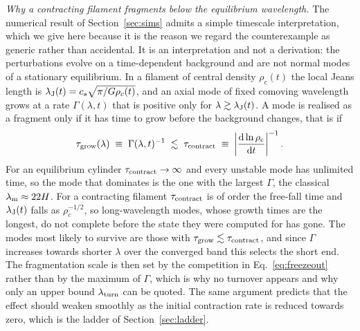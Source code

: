 \documentclass[usenatbib,twoside,twocolumn]{mnras}
\begin{document}
\emph{Why a contracting filament fragments below the equilibrium wavelength.} The numerical result of Section~\ref{sec:sims} admits a simple timescale interpretation, which we give here because it is the reason we regard the counterexample as generic rather than accidental. It is an interpretation and not a derivation: the perturbations evolve on a time-dependent background and are not normal modes of a stationary equilibrium. In a filament of central density $\rho_c(t)$ the local Jeans length is $\lambda_{\rm J}(t)=c_s\sqrt{\pi/G\rho_c(t)}$, and an axial mode of fixed comoving wavelength grows at a rate $\Gamma(\lambda,t)$ that is positive only for $\lambda\gtrsim\lambda_{\rm J}(t)$. A mode is realised as a fragment only if it has time to grow before the background changes, that is if
\begin{equation}
\tau_{\rm grow}(\lambda)\;\equiv\;\Gamma(\lambda,t)^{-1}\;\lesssim\;\tau_{\rm contract}\;\equiv\;\left|\frac{\rm d\ln\rho_c}{{\rm d}t}\right|^{-1}.
\label{eq:freezeout}
\end{equation}
For an equilibrium cylinder $\tau_{\rm contract}\to\infty$ and every unstable mode has unlimited time, so the mode that dominates is the one with the largest $\Gamma$, the classical $\lambda_{\rm m}\approx22H$. For a contracting filament $\tau_{\rm contract}$ is of order the free-fall time and $\lambda_{\rm J}(t)$ falls as $\rho_c^{-1/2}$, so long-wavelength modes, whose growth times are the longest, do not complete before the state they were computed for has gone. The modes most likely to survive are those with $\tau_{\rm grow}\lesssim\tau_{\rm contract}$, and since $\Gamma$ increases towards shorter $\lambda$ over the converged band this selects the short end. The fragmentation scale is then set by the competition in Eq.~\ref{eq:freezeout} rather than by the maximum of $\Gamma$, which is why no turnover appears and why only an upper bound $\lambda_{\rm turn}$ can be quoted. The same argument predicts that the effect should weaken smoothly as the initial contraction rate is reduced towards zero, which is the ladder of Section~\ref{sec:ladder}.




\bsp
\label{lastpage}
\end{document}
